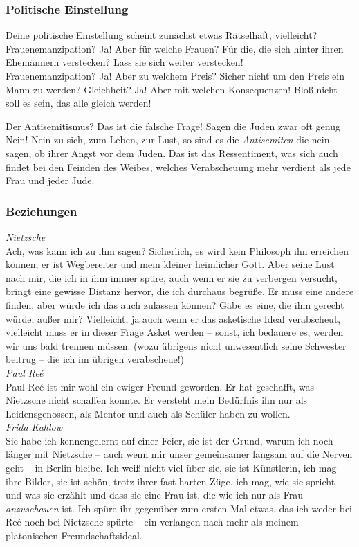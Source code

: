 \documentclass[12pt, a4paper, openany]{report}
\begin{document}
\subsubsection{Politische Einstellung}
Deine politische Einstellung scheint zunächst etwas Rätselhaft, vielleicht? 
Frauenemanzipation? Ja! Aber für welche Frauen? Für die, die sich hinter ihren
Ehemännern verstecken? Lass sie sich weiter verstecken!\\
Frauenemanzipation? Ja! Aber zu welchem Preis? Sicher nicht um den Preis ein
Mann zu werden? 
Gleichheit? Ja! Aber mit welchen Konsequenzen! Bloß nicht soll es sein, das alle
gleich werden!

Der Antisemitismus? Das ist die falsche Frage! Sagen die Juden zwar oft genug
Nein! Nein zu sich, zum Leben, zur Lust, so sind es die \emph{Antisemiten} die
nein sagen, ob ihrer Angst vor dem Juden. 
Das ist das Ressentiment, was sich auch findet bei den Feinden des Weibes,
welches Verabscheuung mehr verdient als jede Frau und jeder Jude.

\subsubsection{Beziehungen}
\emph{Nietzsche}\\
Ach, was kann ich zu ihm sagen? 
Sicherlich, es wird kein Philosoph ihn erreichen können, er ist Wegbereiter und
mein kleiner heimlicher Gott. 
Aber seine Lust nach mir, die ich in ihm immer spüre, auch wenn er sie zu
verbergen versucht, bringt eine gewisse Distanz hervor, die ich durchaus
begrüße. 
Er muss eine andere finden, aber würde ich das auch zulassen können? 
Gäbe es eine, die ihm gerecht würde, außer mir? 
Vielleicht, ja auch wenn er das asketische Ideal verabscheut, vielleicht muss er
in dieser Frage Asket werden -- sonst, ich bedauere es, werden wir uns bald
trennen müssen. 
(wozu übrigens nicht unwesentlich seine Schwester beitrug -- die ich im übrigen
verabscheue!)\bigskip\\
\emph{Paul Reé}\\
Paul Reé ist mir wohl ein ewiger Freund geworden. 
Er hat geschafft, was Nietzsche nicht schaffen konnte. 
Er versteht mein Bedürfnis ihn nur als Leidensgenossen, als Mentor und auch als
Schüler haben zu wollen.\bigskip\\
\emph{Frida Kahlow}\\
Sie habe ich kennengelernt auf einer Feier, sie ist der Grund, warum ich noch
länger mit Nietzsche -- auch wenn mir unser gemeinsamer  langsam auf
die Nerven geht -- in Berlin bleibe. 
Ich weiß nicht viel über sie, sie ist Künstlerin, ich mag ihre Bilder, sie ist
schön, trotz ihrer fast harten Züge, ich mag, wie sie spricht und was sie
erzählt und dass sie eine Frau ist, die wie ich nur als Frau \emph{anzuschauen}
ist. 
Ich spüre ihr gegenüber zum ersten Mal etwas, das ich weder bei Reé noch bei
Nietzsche spürte -- ein verlangen nach mehr als meinem platonischen
Freundschaftsideal.
\end{document}
